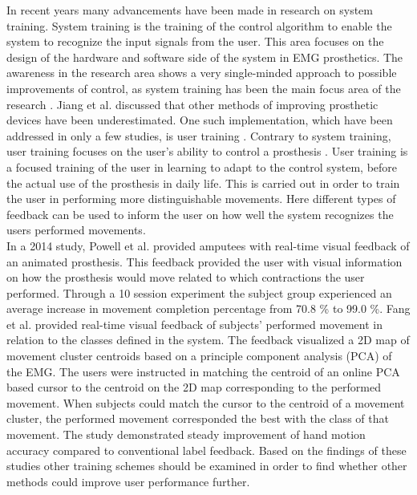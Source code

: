 In recent years many advancements have been made in research on system training. System training is the training of the control algorithm to enable the system to recognize the input signals from the user. This area focuses on the design of the hardware and software side of the system in EMG prosthetics. \cite{Fougner2012} %
The awareness in the research area shows a very single-minded approach to possible improvements of control, as system training has been the main focus area of the research \cite{Jiang2012}. Jiang et al. \cite{Jiang2012} discussed that other methods of improving prosthetic devices have been underestimated. One such implementation, which have been addressed in only a few studies, is user training \cite{Powell2014, Fang2017, Pan2017}. Contrary to system training, user training focuses on the user's ability to control a prosthesis \cite{Fougner2012}. User training is a focused training of the user in learning to adapt to the control system, before the actual use of the prosthesis in daily life. This is carried out in order to train the user in performing more distinguishable movements. Here different types of feedback can be used to inform the user on how well the system recognizes the users performed movements. \cite{Powell2014, Simon2013} \\
In a 2014 study, Powell et al. \cite{Powell2014} provided amputees with real-time visual feedback of an animated prosthesis. This feedback provided the user with visual information on how the prosthesis would move related to which contractions the user performed. Through a 10 session experiment the subject group experienced an average increase in movement completion percentage from 70.8 \% to 99.0 \%. %
Fang et al. \cite{Fang2017} provided real-time visual feedback of subjects' performed movement in relation to the classes defined in the system. The feedback visualized a 2D map of movement cluster centroids based on a principle component analysis (PCA) of the EMG. The users were instructed in matching the centroid of an online PCA based cursor to the centroid on the 2D map corresponding to the performed movement. When subjects could match the cursor to the centroid of a movement cluster, the performed movement corresponded the best with the class of that movement. The study demonstrated steady improvement of hand motion accuracy compared to conventional label feedback. \cite{Fang2017} Based on the findings of these studies other training schemes should be examined in order to find whether other methods could improve user performance further. 

